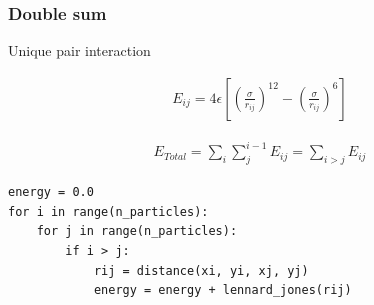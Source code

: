 \begin{frame}[fragile]

    \frametitle{Double sum}

    Unique pair interaction

    \begin{align}
        E_{ij} = 4 \epsilon \left[ \left(\frac{\sigma}{r_{ij}} \right)^{12} - \left(\frac{\sigma}{r_{ij}} \right)^6 \right]
    \end{align}

    \begin{align}
        E_{Total} = \sum_i \sum_{j}^{i-1} E_{ij} = \sum_{i > j} E_{ij}
    \end{align}

\begin{lstlisting}
energy = 0.0
for i in range(n_particles):
    for j in range(n_particles):
        if i > j:
            rij = distance(xi, yi, xj, yj)
            energy = energy + lennard_jones(rij)
\end{lstlisting}

\end{frame}








